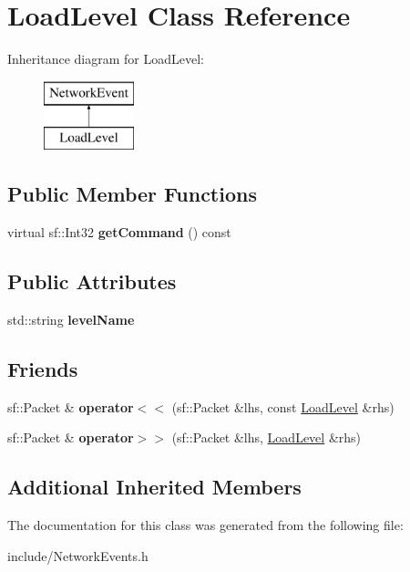 \hypertarget{class_load_level}{\section{Load\-Level Class Reference}
\label{class_load_level}
}
Inheritance diagram for Load\-Level\-:\begin{figure}[H]
\begin{center}
\leavevmode
\includegraphics[height=2.000000cm]{class_load_level}
\end{center}
\end{figure}
\subsection*{Public Member Functions}
\begin{DoxyCompactItemize}
\item 
\hypertarget{class_load_level_a851258beaca8df111c68b57e0ecc466a}{virtual sf\-::\-Int32 {\bfseries get\-Command} () const }\label{class_load_level_a851258beaca8df111c68b57e0ecc466a}

\end{DoxyCompactItemize}
\subsection*{Public Attributes}
\begin{DoxyCompactItemize}
\item 
\hypertarget{class_load_level_a6d6fbda9be04ed3d4458db1b82b2c1cd}{std\-::string {\bfseries level\-Name}}\label{class_load_level_a6d6fbda9be04ed3d4458db1b82b2c1cd}

\end{DoxyCompactItemize}
\subsection*{Friends}
\begin{DoxyCompactItemize}
\item 
\hypertarget{class_load_level_a1de1314296b1d080ca8563ad2278c35a}{sf\-::\-Packet \& {\bfseries operator$<$$<$} (sf\-::\-Packet \&lhs, const \hyperlink{class_load_level}{Load\-Level} \&rhs)}\label{class_load_level_a1de1314296b1d080ca8563ad2278c35a}

\item 
\hypertarget{class_load_level_ac41ff97641eab59514df5bbf1ca459d9}{sf\-::\-Packet \& {\bfseries operator$>$$>$} (sf\-::\-Packet \&lhs, \hyperlink{class_load_level}{Load\-Level} \&rhs)}\label{class_load_level_ac41ff97641eab59514df5bbf1ca459d9}

\end{DoxyCompactItemize}
\subsection*{Additional Inherited Members}


The documentation for this class was generated from the following file\-:\begin{DoxyCompactItemize}
\item 
include/Network\-Events.\-h\end{DoxyCompactItemize}
